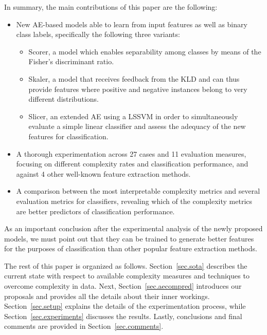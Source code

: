 \documentclass[
	fontsize=11pt, %
	twoside=false, %
	open=any, %
	secnumdepth=1, %
]{kaobook}
\begin{document}
In summary, the main contributions of this paper are the following:
\begin{itemize}
  \item New AE-based models able to learn from input features as well as binary class labels, specifically the following three variants:
        \begin{itemize}
          \item Scorer, a model which enables separability among classes by means of the Fisher's discriminant ratio.
          \item Skaler, a model that receives feedback from the KLD and can thus provide features where positive and negative instances belong to very different distributions.
          \item Slicer, an extended AE using a LSSVM in order to simultaneously evaluate a simple linear classifier and assess the adequacy of the new features for classification.
        \end{itemize}
  \item A thorough experimentation across 27 cases and 11 evaluation measures, focusing on different complexity rates and classification performance, and against 4 other well-known feature extraction methods.
  \item A comparison between the most interpretable complexity metrics and several evaluation metrics for classifiers, revealing which of the complexity metrics are better predictors of classification performance.
\end{itemize}

As an important conclusion after the experimental analysis of the newly proposed models, we must point out that they can be trained to generate better features for the purposes of classification than other popular feature extraction methods.

The rest of this paper is organized as follows. Section~\ref{sec.sota} describes the current state with respect to available complexity measures and techniques to overcome complexity in data. Next, Section~\ref{sec.aecompred} introduces our proposals and provides all the details about their inner workings. Section~\ref{sec.setup} explains the details of the experimentation process, while Section~\ref{sec.experiments} discusses the results. Lastly, conclusions and final comments are provided in Section~\ref{sec.comments}.

\end{document}
